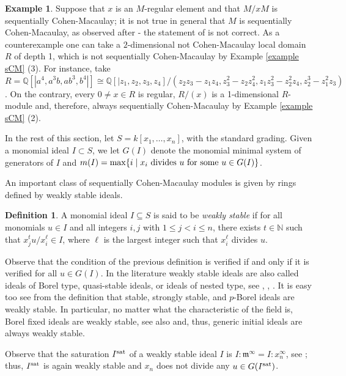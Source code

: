 \documentclass[12pt]{amsart}
\theoremstyle{definition}
\theoremstyle{definition}
\newtheorem{example}[theorem]{Example}
\newtheorem{definition}[theorem]{Definition}
\newcommand{\m}{\mathfrak{m}}
\renewcommand{\leq}{\leqslant}
\begin{document}
\begin{example}\label{regulare}
Suppose that $x$ is an $M$-regular element and that $M/xM$ is sequentially Cohen-Macaulay; it is not true in general that $M$ is sequentially Cohen-Macaulay, as observed after \cite[Proposition 2.2]{TPDA17} - the statement of \cite[Theorem 4.7]{Sch99} is not correct. As a counterexample one can take a $2$-dimensional not Cohen-Macaulay local domain $R$ of depth 1, which is not sequentially Cohen-Macaulay by Example \ref{example sCM} (3). For instance, take  $R=\mathbb{Q}[|a^4,a^3b,ab^3,b^4|] \cong \mathbb{Q}[|z_1,z_2,z_3,z_4]/(z_2 z_3 - z_1 z_4, z_3^2 - z_2 z_4^2, z_1 z_3^2 - z_2^2 z_4, z_2^3 - z_1^2 z_3)$.  On the contrary,  every $0\neq x\in R$ is regular, $R/(x)$ is a 1-dimensional $R$-module and, therefore, always sequentially Cohen-Macaulay by Example \ref{example sCM} (2).
\end{example}

In the rest of this section, let $S=k[x_1,\ldots,x_n]$, with the standard grading.
Given a monomial ideal $I\subset S$, we let $G(I)$ denote the monomial minimal system of generators of $I$ and $m(I)=\max\{i \mid x_i \ {\rm divides } \ u \ {\rm for \ some } \ u \in G(I)\}$.

An important class of sequentially Cohen-Macaulay modules is given by rings defined by weakly stable ideals.
 
\begin{definition}
A monomial ideal $I\subseteq S$ is said to be {\it weakly stable} if for all monomials $u \in I$ and all integers $i,j$ with $1 \leq j < i \leq n$, there exists $t \in \mathbb{N}$ such that $ x_j^t u/x_i^\ell \in I$, where $\ell$ is the largest integer such that $x_i^\ell$ divides $u$.
\end{definition}

Observe that the condition of the previous definition is verified if and only if it is verified for all $u\in G(I)$.
In the  literature weakly stable ideals are also called ideals of Borel type, quasi-stable ideals, or ideals of nested type, see \cite{C04}, \cite{HH11}, \cite{BG06}. It is easy too see from the definition that stable, strongly stable, and $p$-Borel ideals are weakly stable. In particular, no matter what the characteristic of the field is, Borel fixed ideals are weakly stable, see also \cite[Theorem 4.2.10]{HH11} and, thus, generic initial ideals are always weakly stable.

Observe  that the saturation $I^{\rm sat}$ of a weakly stable ideal $I$ is $I:\m^{\infty}= I:x_n^\infty$, see \cite[Proposition 4.2.9]{HH11}; thus,   $I^{\rm sat}$ is  again weakly stable and $x_n$ does not divide any $u\in G(I^{\rm sat})$.
\end{document}
